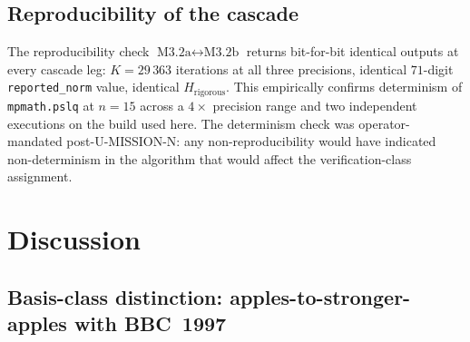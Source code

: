 \documentclass[11pt,a4paper]{article}
\newcommand{\Hrig}{H_{\mathrm{rigorous}}}
\begin{document}
\subsection{Reproducibility of the cascade}\label{sec:repro-cascade}

The reproducibility check
$\text{M3.2a}\leftrightarrow\text{M3.2b}$
returns bit-for-bit identical outputs at every cascade leg:
$K = 29\,363$ iterations at all three precisions, identical $71$-digit
\texttt{reported\_norm} value, identical $\Hrig$.
This empirically confirms determinism of \texttt{mpmath.pslq} at $n=15$
across a $4\times$ precision range and two independent executions on the
build used here.
The determinism check was operator-mandated post-U-MISSION-N: any
non-reproducibility would have indicated non-determinism in the algorithm
that would affect the verification-class assignment.

\section{Discussion}\label{sec:discussion}

\subsection{Basis-class distinction: apples-to-stronger-apples
   with BBC~1997}\label{sec:discussion-apples}
\end{document}

